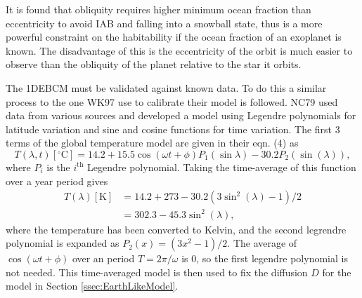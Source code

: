 \documentclass[12pt, onecolumn]{revtex4-2}    %
\newcommand{\degrees}{\ensuremath{^{\circ}}}
\begin{document}
It is found that obliquity requires higher minimum ocean fraction than eccentricity to avoid IAB and falling into a snowball state, thus is a more powerful constraint on the habitability if the ocean fraction of an exoplanet is known. The disadvantage of this is the eccentricity of the orbit is much easier to observe than the obliquity of the planet relative to the star it orbits.

%

The 1DEBCM must be validated against known data.
To do this a similar process to the one WK97 use to calibrate their model is followed.
NC79 used data from various sources and developed a model using Legendre polynomials for latitude variation and sine and cosine functions for time variation.
The first 3 terms of the global temperature model are given in their eqn. (4) as
\begin{equation}
  T(\lambda, t)[\degrees\text{C}] = 14.2 + 15.5 \cos(\omega t + \phi) P_1(\sin\lambda) - 30.2 P_2(\sin(\lambda)),
  \label{eq:NC_timedep}
\end{equation}
where $P_i$ is the $i^\text{th}$ Legendre polynomial.
Taking the time-average of this function over a year period gives
\begin{equation}
  \begin{split}
    T(\lambda)[\text{K}] & = 14.2 + 273 - 30.2 (3 \sin^2(\lambda) - 1) / 2 \\
                         & = 302.3 - 45.3\sin^2(\lambda),
  \end{split}
  \label{eq:NC_timeavg}
\end{equation}
where the temperature has been converted to Kelvin, and the second legrendre polynomial is expanded as $P_2(x) =(3x^2-1) / 2$.
The average of $\cos(\omega t + \phi)$ over an period $T = 2\pi / \omega$ is $0$, so the first legendre polynomial is not needed.
This time-averaged model is then used to fix the diffusion $D$ for the model in Section \ref{ssec:EarthLikeModel}.

\end{document}
